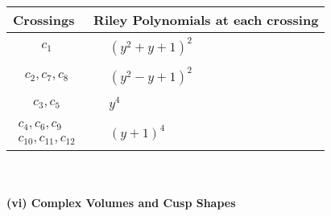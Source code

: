 \documentclass[1p]{elsarticle_modified}
\theoremstyle{definition}
\begin{document}
\begin{tabular}{m{50pt}|m{274pt}}
Crossings & \hspace{64pt}Riley Polynomials at each crossing \\
\hline $$\begin{aligned}c_{1}\end{aligned}$$&$\begin{aligned}
&(y^2+y+1)^2
\end{aligned}$\\
\hline $$\begin{aligned}c_{2},c_{7},c_{8}\end{aligned}$$&$\begin{aligned}
&(y^2- y+1)^2
\end{aligned}$\\
\hline $$\begin{aligned}c_{3},c_{5}\end{aligned}$$&$\begin{aligned}
&y^4
\end{aligned}$\\
\hline $$\begin{aligned}c_{4},c_{6},c_{9}\\c_{10},c_{11},c_{12}\end{aligned}$$&$\begin{aligned}
&(y+1)^4
\end{aligned}$\\
\hline
\end{tabular}\\~\\
\newpage\flushleft \textbf{(vi) Complex Volumes and Cusp Shapes}
\end{document}
